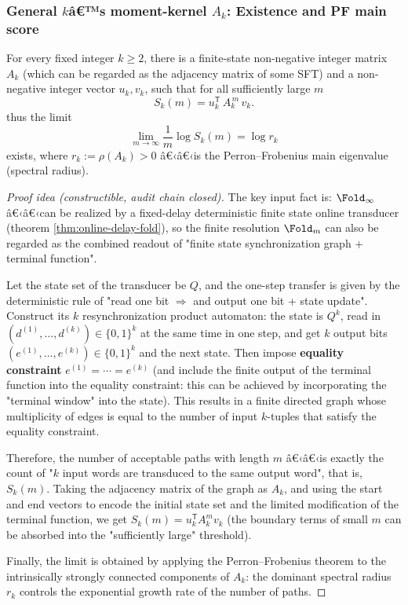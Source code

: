 \subsubsection{General \texorpdfstring{$k$}{k}â€™s moment-kernel \texorpdfstring{$A_k$}{Ak}: Existence and PF main score}\label{subsec:pom-ak-existence}
\begin{theorem}\label{thm:pom-collision-kernel-ak}
For every fixed integer $k\ge 2$, there is a finite-state non-negative integer matrix $A_k$ (which can be regarded as the adjacency matrix of some SFT) and a non-negative integer vector $u_k,v_k$, such that for all sufficiently large $m$
\[
S_k(m)=u_k^{\mathsf T}\,A_k^{\,m}\,v_k.
\]
thus the limit
\[
\lim_{m\to\infty}\frac{1}{m}\log S_k(m)=\log r_k
\]
exists, where $r_k:=\rho(A_k)>0$ â€‹â€‹is the Perron--Frobenius main eigenvalue (spectral radius).
\end{theorem}
\begin{proof}[Proof idea (constructible, audit chain closed)]
The key input fact is: $\Fold_\infty$ â€‹â€‹can be realized by a fixed-delay deterministic finite state online transducer (theorem \ref{thm:online-delay-fold}), so the finite resolution $\Fold_m$ can also be regarded as the combined readout of "finite state synchronization graph + terminal function".

Let the state set of the transducer be $Q$, and the one-step transfer is given by the deterministic rule of "read one bit $\Rightarrow$ and output one bit + state update". Construct its $k$ resynchronization product automaton: the state is $Q^k$, read in $(d^{(1)},\dots,d^{(k)})\in\{0,1\}^k$ at the same time in one step, and get $k$ output bits $(e^{(1)},\dots,e^{(k)})\in\{0,1\}^k$ and the next state. Then impose \textbf{equality constraint} $e^{(1)}=\cdots=e^{(k)}$ (and include the finite output of the terminal function into the equality constraint: this can be achieved by incorporating the "terminal window" into the state). This results in a finite directed graph whose multiplicity of edges is equal to the number of input $k$-tuples that satisfy the equality constraint.

Therefore, the number of acceptable paths with length $m$ â€‹â€‹is exactly the count of "$k$ input words are transduced to the same output word", that is, $S_k(m)$. Taking the adjacency matrix of the graph as $A_k$, and using the start and end vectors to encode the initial state set and the limited modification of the terminal function, we get $S_k(m)=u_k^{\mathsf T}A_k^{m}v_k$ (the boundary terms of small $m$ can be absorbed into the "sufficiently large" threshold).

Finally, the limit is obtained by applying the Perron--Frobenius theorem to the intrinsically strongly connected components of $A_k$: the dominant spectral radius $r_k$ controls the exponential growth rate of the number of paths.
\end{proof}

